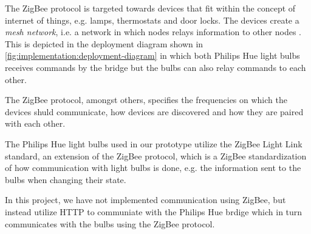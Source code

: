 The ZigBee protocol is targeted towards devices that fit within the concept of internet of things, e.g. lamps, thermostats and door locks. The devices create a \emph{mesh network}, i.e. a network in which nodes relays information to other nodes \cite{zigbee:zigbee-pro}. This is depicted in the deployment diagram shown in \cref{fig:implementation:deployment-diagram} in which both Philips Hue light bulbs receives commands by the bridge but the bulbs can also relay commands to each other.

The ZigBee protocol, amongst others, specifies the frequencies on which the devices shuld communicate, how devices are discovered and how they are paired with each other.

The Philips Hue light bulbs used in our prototype utilize the ZigBee Light Link standard, an extension of the ZigBee protocol, which is a ZigBee standardization of how communication with light bulbs is done, e.g. the information sent to the bulbs when changing their state.

In this project, we have not implemented communication using ZigBee, but instead utilize HTTP to communiate with the Philips Hue brdige which in turn communicates with the bulbs using the ZigBee protocol.

